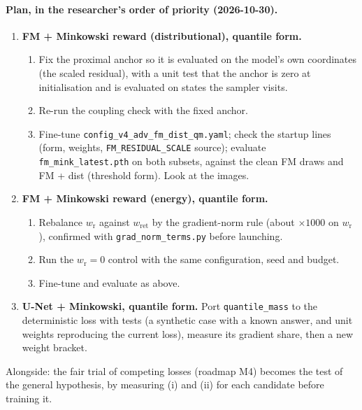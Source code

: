 \documentclass[11pt,a4paper]{article}
\begin{document}
\paragraph{Plan, in the researcher's order of priority (2026-10-30).}
\begin{enumerate}[leftmargin=1.4em]
\item \textbf{FM + Minkowski reward (distributional), quantile form.}
  \begin{enumerate}[nosep]
  \item Fix the proximal anchor so it is evaluated on the model's own coordinates (the scaled residual), with a unit
  test that the anchor is zero at initialisation and is evaluated on states the sampler visits.
  \item Re-run the coupling check with the fixed anchor.
  \item Fine-tune \texttt{config\_v4\_adv\_fm\_dist\_qm.yaml}; check the startup lines (form, weights,
  \texttt{FM\_RESIDUAL\_SCALE} source); evaluate \texttt{fm\_mink\_latest.pth} on both subsets, against the clean FM
  draws and FM + dist (threshold form). Look at the images.
  \end{enumerate}
\item \textbf{FM + Minkowski reward (energy), quantile form.}
  \begin{enumerate}[nosep]
  \item Rebalance $w_{\mathrm r}$ against $w_{\mathrm{ret}}$ by the gradient-norm rule (about $\times1000$ on
  $w_{\mathrm r}$), confirmed with \texttt{grad\_norm\_terms.py} before launching.
  \item Run the $w_{\mathrm r} = 0$ control with the same configuration, seed and budget.
  \item Fine-tune and evaluate as above.
  \end{enumerate}
\item \textbf{U-Net + Minkowski, quantile form.} Port \texttt{quantile\_mass} to the deterministic loss with tests (a
synthetic case with a known answer, and unit weights reproducing the current loss), measure its gradient share, then a
new weight bracket.
\end{enumerate}

\noindent Alongside: the fair trial of competing losses (roadmap M4) becomes the test of the general hypothesis, by
measuring (i) and (ii) for each candidate before training it.



\end{document}
